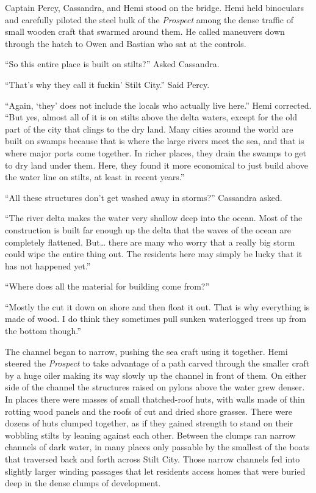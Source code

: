 \documentclass[]{scrbook}
\begin{document}
Captain Percy, Cassandra, and Hemi stood on the bridge. Hemi held
binoculars and carefully piloted the steel bulk of the \emph{Prospect}
among the dense traffic of small wooden craft that swarmed around them.
He called maneuvers down through the hatch to Owen and Bastian who sat
at the controls.

``So this entire place is built on stilts?'' Asked Cassandra.

``That's why they call it fuckin' Stilt City.'' Said Percy.

``Again, `they' does not include the locals who actually live here.''
Hemi corrected. ``But yes, almost all of it is on stilts above the delta
waters, except for the old part of the city that clings to the dry land.
Many cities around the world are built on swamps because that is where
the large rivers meet the sea, and that is where major ports come
together. In richer places, they drain the swamps to get to dry land
under them. Here, they found it more economical to just build above the
water line on stilts, at least in recent years.''

``All these structures don't get washed away in storms?'' Cassandra
asked.

``The river delta makes the water very shallow deep into the ocean. Most
of the construction is built far enough up the delta that the waves of
the ocean are completely flattened. But\ldots{} there are many who worry
that a really big storm could wipe the entire thing out. The residents
here may simply be lucky that it has not happened yet.''

``Where does all the material for building come from?''

``Mostly the cut it down on shore and then float it out. That is why
everything is made of wood. I do think they sometimes pull sunken
waterlogged trees up from the bottom though.''

The channel began to narrow, pushing the sea craft using it together.
Hemi steered the \emph{Prospect} to take advantage of a path carved
through the smaller craft by a huge oiler making its way slowly up the
channel in front of them. On either side of the channel the structures
raised on pylons above the water grew denser. In places there were
masses of small thatched-roof huts, with walls made of thin rotting wood
panels and the roofs of cut and dried shore grasses. There were dozens
of huts clumped together, as if they gained strength to stand on their
wobbling stilts by leaning against each other. Between the clumps ran
narrow channels of dark water, in many places only passable by the
smallest of the boats that traversed back and forth across Stilt City.
Those narrow channels fed into slightly larger winding passages that let
residents access homes that were buried deep in the dense clumps of
development.
\end{document}
